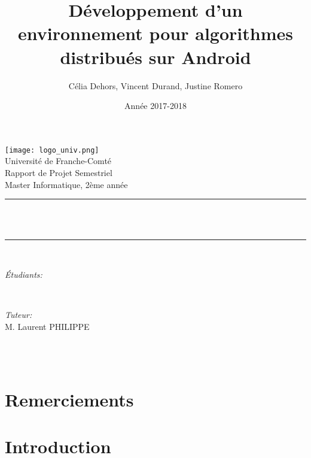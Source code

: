 \documentclass[a4paper,10pt]{report}
\title{Développement d'un environnement pour algorithmes distribués sur Android}
\author{Célia Dehors, Vincent Durand, Justine Romero}
\date{Année 2017-2018}
\makeatletter
\let\thetitle\@title
\let\theauthor\@author
\let\thedate\@date
\makeatother
\begin{document}
  
  \begin{titlepage}
    \centering
    \vspace*{0.5 cm}
    \texttt{[image: logo\_univ.png]}\\[1.0 cm]   %
    \LARGE Université de Franche-Comté\\[2.0 cm]   %
    \Large Rapport de Projet Semestriel\\               %
    \large Master Informatique, 2ème année\\[2.5 cm]               %
    \rule{\linewidth}{0.2 mm} \\[2.5 mm]
    { \huge \bfseries \thetitle}\\
    \rule{\linewidth}{0.2 mm} \\[2.0 cm]
    
    \begin{minipage}{0.6\textwidth}
        \begin{flushleft} \large
            \emph{Étudiants:}\\
            \theauthor
        \end{flushleft}
    \end{minipage}~
    \begin{minipage}{0.4\textwidth}
        \begin{flushleft} \large
            \emph{Tuteur:}\\
            M. Laurent PHILIPPE
        \end{flushleft}
    \end{minipage}\\[3.0 cm]
    {\large \thedate}\\[2 cm]
    \vfill
    
\end{titlepage}
\chapter*{Remerciements}
\begin{changemargin}{0cm}{0cm}{-10cm}{0cm}
\tableofcontents
\end{changemargin}

\chapter{Introduction}
  \paragraph{}
\end{document}
